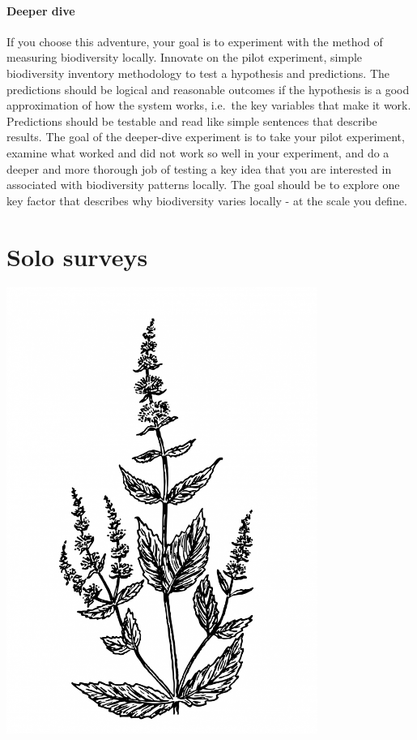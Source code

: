\documentclass[
]{book}
\begin{document}
\hypertarget{deeper-dive}{%
\subsubsection*{Deeper dive}\label{deeper-dive}}

If you choose this adventure, your goal is to experiment with the method of measuring biodiversity locally. Innovate on the pilot experiment, simple biodiversity inventory methodology to test a hypothesis and predictions. The predictions should be logical and reasonable outcomes if the hypothesis is a good approximation of how the system works, i.e.~the key variables that make it work. Predictions should be testable and read like simple sentences that describe results. The goal of the deeper-dive experiment is to take your pilot experiment, examine what worked and did not work so well in your experiment, and do a deeper and more thorough job of testing a key idea that you are interested in associated with biodiversity patterns locally. The goal should be to explore one key factor that describes why biodiversity varies locally - at the scale you define.

\hypertarget{survey}{%
\chapter{Solo surveys}\label{survey}}

\includegraphics[width=4in,height=\textheight]{./plant.jpg}
\end{document}

